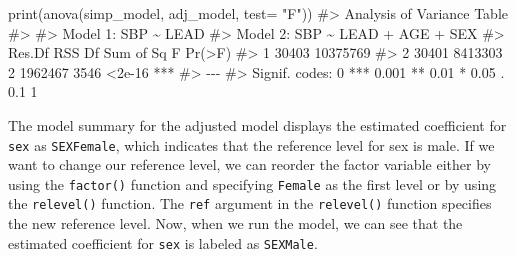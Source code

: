 \documentclass[
  letterpaper,
]{latex/krantz}
\makeatletter
\newenvironment{Shaded}{\begin{snugshade}}{\end{snugshade}}
\newcommand{\AttributeTok}[1]{\textcolor[rgb]{0.40,0.45,0.13}{#1}}
\newcommand{\CommentTok}[1]{\textcolor[rgb]{0.37,0.37,0.37}{#1}}
\newcommand{\FunctionTok}[1]{\textcolor[rgb]{0.28,0.35,0.67}{#1}}
\newcommand{\NormalTok}[1]{\textcolor[rgb]{0.00,0.23,0.31}{#1}}
\newcommand{\OtherTok}[1]{\textcolor[rgb]{0.00,0.23,0.31}{#1}}
\newcommand{\SpecialCharTok}[1]{\textcolor[rgb]{0.37,0.37,0.37}{#1}}
\newcommand{\StringTok}[1]{\textcolor[rgb]{0.13,0.47,0.30}{#1}}
\newenvironment{kframe}{%
\medskip{}
\setlength{\fboxsep}{.8em}
 \def\at@end@of@kframe{}%
 \ifinner\ifhmode%
  \def\at@end@of@kframe{\end{minipage}}%
  \begin{minipage}{\columnwidth}%
 \fi\fi%
 \def\FrameCommand##1{\hskip\@totalleftmargin \hskip-\fboxsep
 \colorbox{shadecolor}{##1}\hskip-\fboxsep
     \hskip-\linewidth \hskip-\@totalleftmargin \hskip\columnwidth}%
 \MakeFramed {\advance\hsize-\width
   \@totalleftmargin\z@ \linewidth\hsize
   \@setminipage}}%
 {\par\unskip\endMakeFramed%
 \at@end@of@kframe}
\renewenvironment{Shaded}{\begin{kframe}}{\end{kframe}}
\makeatother
\begin{document}
\begin{Shaded}
\begin{Highlighting}[]
\FunctionTok{print}\NormalTok{(}\FunctionTok{anova}\NormalTok{(simp\_model, adj\_model, }\AttributeTok{test=} \StringTok{"F"}\NormalTok{))}
\CommentTok{\#\textgreater{} Analysis of Variance Table}
\CommentTok{\#\textgreater{} }
\CommentTok{\#\textgreater{} Model 1: SBP \textasciitilde{} LEAD}
\CommentTok{\#\textgreater{} Model 2: SBP \textasciitilde{} LEAD + AGE + SEX}
\CommentTok{\#\textgreater{}   Res.Df      RSS Df Sum of Sq    F Pr(\textgreater{}F)    }
\CommentTok{\#\textgreater{} 1  30403 10375769                             }
\CommentTok{\#\textgreater{} 2  30401  8413303  2   1962467 3546 \textless{}2e{-}16 ***}
\CommentTok{\#\textgreater{} {-}{-}{-}}
\CommentTok{\#\textgreater{} Signif. codes:  0 \textquotesingle{}***\textquotesingle{} 0.001 \textquotesingle{}**\textquotesingle{} 0.01 \textquotesingle{}*\textquotesingle{} 0.05 \textquotesingle{}.\textquotesingle{} 0.1 \textquotesingle{} \textquotesingle{} 1}
\end{Highlighting}
\end{Shaded}

The model summary for the adjusted model displays the estimated
coefficient for \texttt{sex} as \texttt{SEXFemale}, which indicates that
the reference level for sex is male. If we want to change our reference
level, we can reorder the
factor variable either by using the \texttt{factor()} function and
specifying \texttt{Female} as the first level or by using the
\texttt{relevel()}
function. The \texttt{ref} argument in the \texttt{relevel()} function
specifies the new reference level. Now, when we run the model, we can
see that the estimated coefficient for \texttt{sex} is labeled as
\texttt{SEXMale}.

\begin{Shaded}
\end{Shaded}
\end{document}

